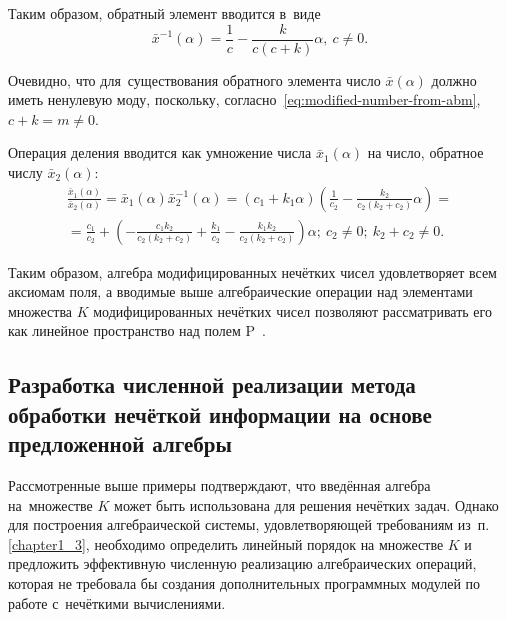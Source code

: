 Таким образом, обратный элемент вводится в~виде
\begin{equation}
\label{eq:modified-inverse-division}
  \bar{x}^{-1}(\alpha )=\frac{1}{c}-\frac{k}{c\left(c+k\right)}\alpha,\ c\ne 0.
\end{equation}

Очевидно, что для~существования обратного элемента число $\bar{x}\left( \alpha  \right)$ должно иметь ненулевую моду, поскольку, согласно~\eqref{eq:modified-number-from-abm}, $c+k=m\ne 0$.

Операция деления вводится как умножение числа $\bar{x}_1\left( \alpha  \right)$ на число, обратное числу $\bar{x}_2\left( \alpha  \right)$:
\begin{gather*}
  \frac{\bar{x}_1\left( \alpha \right)}{\bar{x}_2\left( \alpha  \right)}=\bar{x}_1\left( \alpha  \right)\bar{x}_{2}^{-1}\left( \alpha \right)=\left( c_1+k_1\alpha  \right)\left( \frac{1}{c_2}-\frac{k_2}{c_2\left( k_2+c_2 \right)}\alpha \right)={} \\ 
  {}=\frac{c_1}{c_2}+\left( -\frac{c_1k_2}{c_2\left( k_2+c_2 \right)}+\frac{k_1}{c_2}-\frac{k_1k_2}{c_2\left( k_2+c_2 \right)} \right)\alpha;\ c_2\ne 0;\ k_2+c_2\ne 0.
\end{gather*}

Таким образом, алгебра модифицированных нечётких чисел удовлетворяет всем аксиомам поля, а вводимые выше алгебраические операции над элементами множества $K$ модифицированных нечётких чисел позволяют рассматривать его как линейное пространство над полем P~\cite{Voevodin}.

\subsection{Разработка численной реализации метода обработки нечёткой информации на основе предложенной алгебры}

Рассмотренные выше примеры подтверждают, что введённая алгебра на~множестве $K$ может быть использована для решения нечётких задач. Однако для построения алгебраической системы, удовлетворяющей требованиям из~п.\ref{chapter1_3}, необходимо определить линейный порядок на множестве $K$ и предложить эффективную численную реализацию алгебраических операций, которая не требовала бы создания дополнительных программных модулей по работе с~нечёткими вычислениями. 

